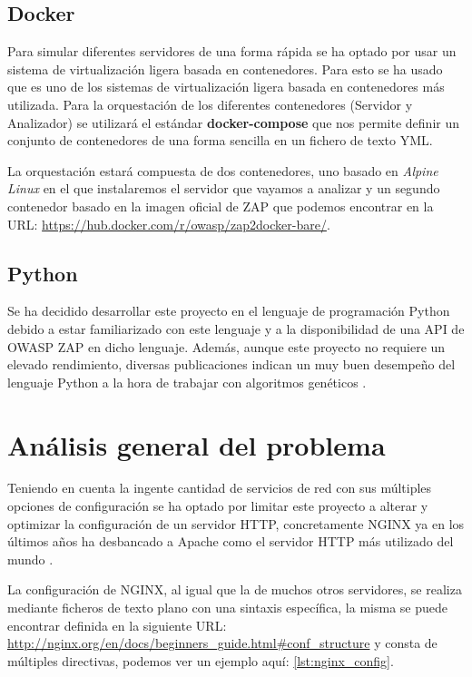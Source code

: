 \subsection{Docker}

Para simular diferentes servidores de una forma rápida se ha optado por usar un sistema de virtualización ligera basada en contenedores. Para esto se ha usado  que es uno de los sistemas de virtualización ligera basada en contenedores más utilizada. Para la orquestación de los diferentes contenedores (Servidor y Analizador) se utilizará el estándar \textbf{docker-compose} que nos permite definir un conjunto de contenedores de una forma sencilla en un fichero de texto YML.

\bigskip
La orquestación estará compuesta de dos contenedores, uno basado en \textit{Alpine Linux} en el que instalaremos el servidor que vayamos a analizar y un segundo contenedor basado en la imagen oficial de ZAP que podemos encontrar en la URL: \url{https://hub.docker.com/r/owasp/zap2docker-bare/}.

\subsection{Python}

Se ha decidido desarrollar este proyecto en el lenguaje de programación Python debido a estar familiarizado con este lenguaje y a la disponibilidad de una API de OWASP ZAP en dicho lenguaje. Además, aunque este proyecto no requiere un elevado rendimiento, diversas publicaciones indican un muy buen desempeño del lenguaje Python a la hora de trabajar con algoritmos genéticos \cite{merelo-guervos_comparison_2016}.

\section{Análisis general del problema}

Teniendo en cuenta la ingente cantidad de servicios de red con sus múltiples opciones de configuración se ha optado por limitar este proyecto a alterar y optimizar la configuración de un servidor HTTP, concretamente NGINX ya en los últimos años ha desbancado a Apache como el servidor HTTP  más utilizado del mundo \cite{w3techs_usage_2019}.

\bigskip
La configuración de NGINX, al igual que la de muchos otros servidores, se realiza mediante ficheros de texto plano con una sintaxis específica, la misma se puede encontrar definida en la siguiente URL: \url{http://nginx.org/en/docs/beginners_guide.html#conf_structure} y consta de múltiples directivas, podemos ver un ejemplo aquí: \ref{lst:nginx_config}.

